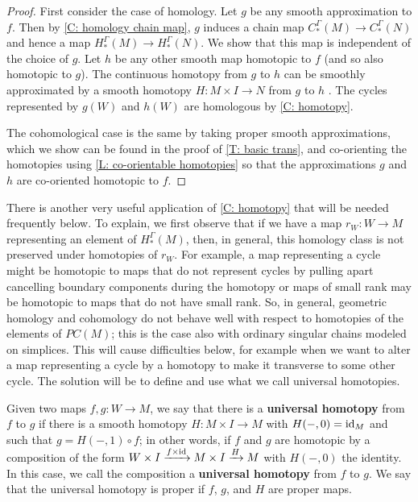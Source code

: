 \begin{proof}
	First consider the case of homology.
	Let $g$ be any smooth approximation to $f$.
	Then by \cref{C: homology chain map}, $g$ induces a chain map $C_*^\Gamma(M) \to C_*^\Gamma(N)$ and hence a map $H_*^\Gamma(M) \to H_*^\Gamma(N)$.
	We show that this map is independent of the choice of $g$.
	Let $h$ be any other smooth map homotopic to $f$ (and so also homotopic to $g$).
	The continuous homotopy from $g$ to $h$ can be smoothly approximated by a smooth homotopy $H \colon M \times I \to N$ from $g$ to $h$ \cite[Theorem III.2.5]{Kos93}.
	The cycles represented by $g(W)$ and $h(W)$ are homologous by \cref{C: homotopy}.


	The cohomological case is the same by taking proper smooth approximations, which we show can be found in the proof of \cref{T: basic trans}, and co-orienting the homotopies using \cref{L: co-orientable homotopies} so that the approximations $g$ and $h$ are co-oriented homotopic to $f$.
\end{proof}

There is another very useful application of \cref{C: homotopy} that will be needed frequently below.
To explain, we first observe that if we have a map $r_W \colon W \to M$ representing an element of $H_*^\Gamma(M)$, then, in general, this homology class is not preserved under homotopies of $r_W$.
For example, a map representing a cycle might be homotopic to maps that do not represent cycles by pulling apart cancelling boundary components during the homotopy or maps of small rank may be homotopic to maps that do not have small rank.
So, in general, geometric homology and cohomology do not behave well with respect to homotopies of the elements of $PC(M)$; this is the case also with ordinary singular chains modeled on simplices.
This will cause difficulties below, for example when we want to alter a map representing a cycle by a homotopy to make it transverse to some other cycle.
The solution will be to define and use what we call universal homotopies.

\begin{definition}\label{D: universal homotopy}
	Given two maps $f,g \colon W\to M$, we say that there is a \textbf{universal homotopy} from $f$ to $g$ if there is a smooth homotopy $H \colon M\times I\to M$ with $H(-,0)=\mathrm{id}_M$ and such that $g=H(-,1)\circ f$; in other words, if $f$ and $g$ are homotopic by a composition of the form $W \times I \xrightarrow{f\times \mathrm{id}} M \times I \xrightarrow{H} M$ with $H(-,0)$ the identity. In this case, we call the composition a \textbf{universal homotopy} from $f$ to $g$. We say that the universal homotopy is proper if $f$, $g$, and $H$ are proper maps.
\end{definition}

